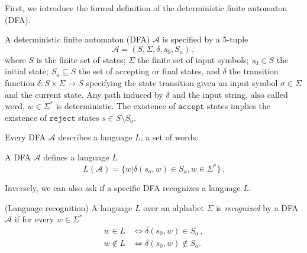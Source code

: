 \documentclass[../main.tex]{subfiles}
\begin{document}
First, we introduce the formal definition of the deterministic finite automaton (DFA).
\begin{definition}\label{def:dfa} A deterministic finite automaton (DFA) $\mathcal{A}$ is specified by a 5-tuple 
\begin{equation}
    \mathcal{A} = (S, \Sigma, \delta, s_0, S_a) \, ,
\end{equation}
where $S$ is the finite set of states; $\Sigma$ the finite set of input symbols; $s_0 \in S$ the initial state; $S_a \subseteq S$ the set of accepting or final  states, and $\delta$ the transition function $\delta: S \times \Sigma \rightarrow S$ specifying the state transition given an input symbol $\sigma \in  \Sigma$ and the current state. Any path induced by $\delta$ and the input string, also called word, $w \in \Sigma^*$ is deterministic. The existence of $\mathtt{accept}$ states implies the existence of $\mathtt{reject}$  states $s \in S \setminus S_a$.
\end{definition}
Every DFA $\mathcal{A}$ describes a language $L$, a set of words:
\begin{definition} A DFA $\mathcal{A}$ defines a language $L$
    \begin{equation}
    L(\mathcal{A}) = \{ w | \delta(s_o,w) \in S_a, w \in \Sigma^* \} \, .
\end{equation}
\end{definition}
Inversely, we can also ask if a specific DFA recognizes a language $L$.
\begin{definition} (Language recognition)
    A language $L$ over an alphabet $\Sigma$ is \textit{recognized} by a DFA $\mathcal{A}$ if for every $w \in \Sigma^*$
    \begin{align}
        w \in L &\iff \delta (s_0,w) \in S_a \, , \\
        w \notin L &\iff \delta (s_0,w) \notin S_a  .
    \end{align}
\end{definition}
\end{document}
